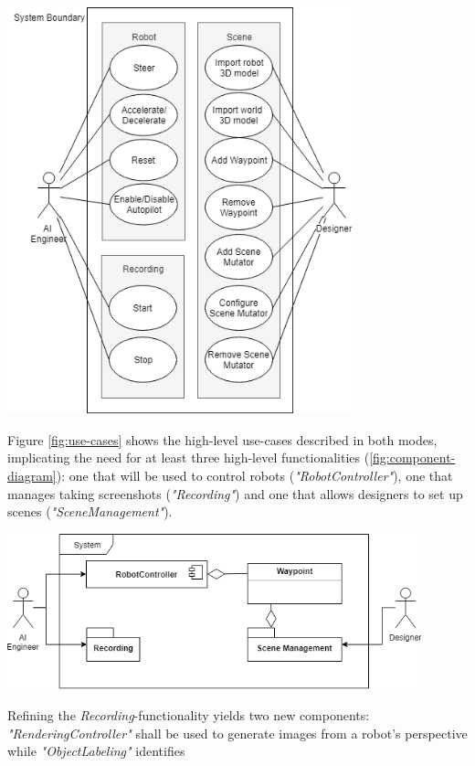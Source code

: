 \begin{center}
\noindent\includegraphics[width=10cm]{tex/img/ch04/Use_Cases_05.png}
\label{fig:use-cases}
\end{center}

Figure \ref{fig:use-cases} shows the high-level use-cases described in both modes, implicating the need for at least three high-level functionalities (\ref{fig:component-diagram}): one that will be used to control robots (\textit{"RobotController"}), one that manages taking screenshots (\textit{"Recording"}) and one that allows designers to set up scenes (\textit{"SceneManagement"}).

\begin{center}
\noindent\includegraphics[width=12cm]{tex/img/ch04/Component_Diagram01.png}
\label{fig:component-diagram}
\end{center}

Refining the \textit{Recording}-functionality yields two new components: \textit{"RenderingController"} shall be used to generate images from a robot's perspective while \textit{"ObjectLabeling"} identifies


